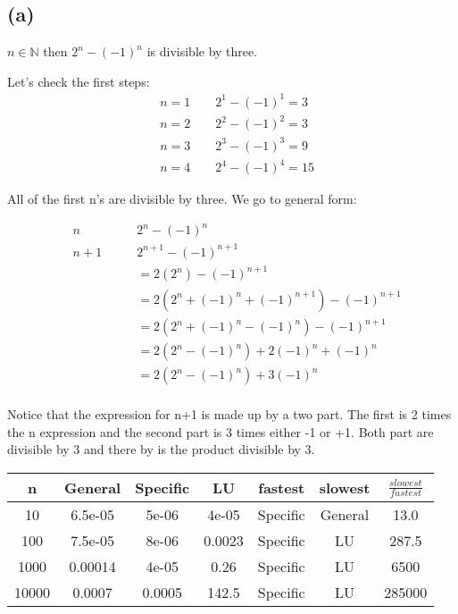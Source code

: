 



\section{}%

\subsection*{(a)}


$n \in \mathbb{N}$ then $2^n - (-1)^n$ is divisible by three.


Let's check the first steps: 
\begin{align*}
&n = 1 \qquad 2^1 - (-1)^1 = 3\\
&n = 2 \qquad 2^2 - (-1)^2 = 3\\
&n = 3 \qquad 2^3 - (-1)^3 = 9\\
&n = 4 \qquad 2^4 - (-1)^4 = 15
\end{align*}

All of the first n's are divisible by three. 
We go to general form: 

\begin{align*}
&n \qquad &2^n - (-1)^n\\
&n+1 \qquad &2^{n+1} - (-1)^{n+1} \\
& &= 2(2^{n}) - (-1)^{n+1}\\
& &= 2(2^{n} + (-1)^n  + (-1)^{n+1}) - (-1)^{n+1}\\
& &= 2(2^{n} + (-1)^n  - (-1)^{n}) - (-1)^{n+1}\\
& &= 2(2^{n}- (-1)^{n}) + 2(-1)^n  + (-1)^{n}\\
& &= 2(2^{n}- (-1)^{n}) + 3(-1)^n \\
\end{align*}

Notice that the expression for n+1 is made up by a two part. The first is 2 times the n expression and the second part is 3 times either -1 or +1. Both part are divisible by 3 and there by is the product divisible by 3. 




\begin{tabular}{|c|c|c|c|c|c|c|}
	\hline 
	n & General & Specific & LU & fastest & slowest & $\frac{slowest}{fastest}$\\ 
	\hline
	10 & 6.5e-05 & 5e-06 & 4e-05 & Specific & General & 13.0\\ 
	\hline 
	100 & 7.5e-05 & 8e-06 & 0.0023 & Specific & LU & 287.5\\ 
	\hline 
	1000 & 0.00014 & 4e-05 & 0.26 & Specific & LU & 6500\\ 
	\hline
	10000 & 0.0007 & 0.0005 & 142.5 & Specific & LU & 285000 \\ 
	\hline
\end{tabular}
%



